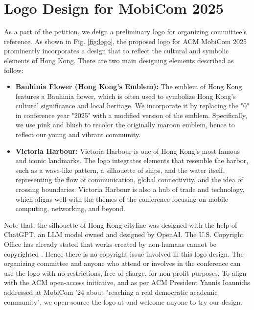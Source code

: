 \documentclass[sigconf, 10pt]{acmart}
\begin{document}
\section{Logo Design for MobiCom 2025}
As a part of the petition, we deign a preliminary logo for organizing committee's  reference. As shown in Fig. \ref{fig:logo}, the proposed logo for ACM MobiCom 2025 prominently incorporates a design that to reflect the cultural and symbolic elements of Hong Kong. There are two main designing elements described as follow:
\begin{itemize}[leftmargin=*]
	\item \textbf{Bauhinia Flower (Hong Kong’s Emblem):} The emblem of Hong Kong features a Bauhinia flower, which is often used to symbolize Hong Kong’s cultural significance and local heritage. We incorporate it by replacing the "0" in conference year "2025" with a modified version of the emblem. Specifically, we use pink and blush to recolor the originally maroon emblem, hence to reflect our young and vibrant community.
	
	\item \textbf{Victoria Harbour:} Victoria Harbour is one of Hong Kong’s most famous and iconic landmarks. The logo integrates elements that resemble the harbor, such as a wave-like pattern, a silhouette of ships, and the water itself, representing the flow of communication, global connectivity, and the idea of crossing boundaries. Victoria Harbour is also a hub of trade and technology, which aligns well with the themes of the conference focusing on mobile computing, networking, and beyond.
\end{itemize}
Note that, the silhouette of Hong Kong cityline  was designed with the help of ChatGPT, an LLM model owned and designed by OpenAI. The U.S. Copyright Office has already stated that works created by non-humans cannot be copyrighted \cite{copyright}. Hence there is no copyright issue involved in this logo design. The organizing committee and anyone who attend or involves in the conference can use the logo with no restrictions, free-of-charge, for non-profit purposes. To align with the ACM open-access initiative, and as per ACM President Yannis Ioannidis addressed at MobiCom '24 about "reaching a real democratic academic community", we open-source the logo at \cite{logo} and welcome anyone to try our design.
\end{document}
